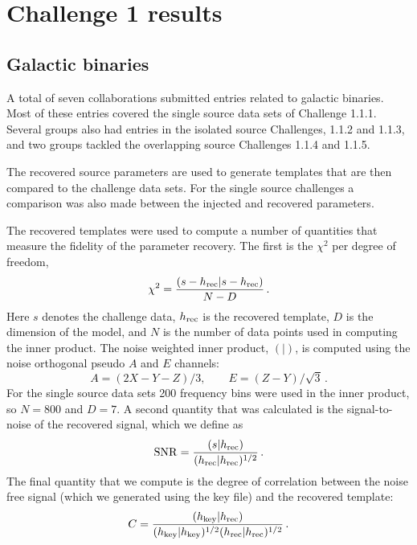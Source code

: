 \documentclass[11pt]{article}
\begin{document}
\section{Challenge 1 results}

\subsection{Galactic binaries}

A total of seven collaborations submitted entries related to galactic binaries.
Most of these entries covered the single source data sets of Challenge 1.1.1.
Several groups also had entries in the isolated source Challenges, 1.1.2
and 1.1.3, and two groups tackled the overlapping source Challenges 1.1.4 and
1.1.5.

The recovered source parameters are used to generate templates that are then
compared to the challenge data sets. For the single source challenges a comparison
was also made between the injected and recovered parameters.

The recovered templates were used to compute a number of quantities that
measure the fidelity of the parameter recovery. The first is the $\chi^2$
per degree of freedom,
\begin{equation}
\chi^2 = \frac{ ( s -h_{\rm rec} | s -h_{\rm rec})}{N -D} \, .
\end{equation}
Here $s$ denotes the challenge data, $h_{\rm rec}$ is the recovered template,
$D$ is the dimension of the model, and $N$ is the number of data points
used in computing the inner product. The noise weighted inner product, $( | )$, is
computed using the noise orthogonal pseudo $A$ and $E$ channels:
\begin{equation}
A = (2 X - Y -Z)/3, \quad \quad E = (Z-Y)/\sqrt{3} \, .
\end{equation}
For the single source data sets 200 frequency bins were used in the
inner product, so $N=800$ and $D=7$. A second quantity that was calculated
is the signal-to-noise of the recovered signal, which we define as
\begin{equation}
{\rm SNR} = \frac{(s | h_{\rm rec})}{(h_{\rm rec} | h_{\rm rec})^{1/2}} \, .
\end{equation}
The final quantity that we compute is the degree of correlation between the
noise free signal (which we generated using the key file) and the
recovered template:
\begin{equation}
C = \frac{( h_{\rm key} | h_{\rm rec})}{(h_{\rm key} | h_{\rm key})^{1/2}(h_{\rm rec} | h_{\rm rec})^{1/2}} \, .
\end{equation}
\end{document}
